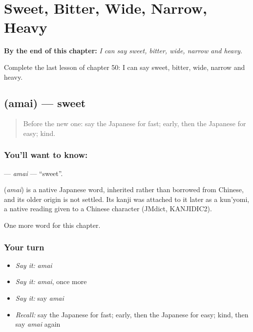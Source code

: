 
\chapter{Sweet, Bitter, Wide, Narrow, Heavy}
\label{ch:ja-sweet-bitter-wide-narrow-heavy}

\begin{chapteropening}
\textbf{By the end of this chapter:} \emph{I can say sweet, bitter, wide, narrow and heavy.}

Complete the last lesson of chapter 50: I can say sweet, bitter, wide, narrow and heavy.
\end{chapteropening}

\section[\texorpdfstring{\ja{あまい} (amai)}{あまい (amai)}]{ (amai) — sweet}

\label{lesson:JA-C50-amai}



\begin{quote}
Before the new one: say the Japanese for fast; early, then the Japanese for easy; kind.
\end{quote}

\subsection*{You'll want to know: }
\textbf{} — \emph{amai} — \textquotedblleft{}sweet\textquotedblright{}.

\begin{cousinweb}
\textbf{} (\emph{amai}) is a native Japanese word, inherited rather than borrowed from Chinese, and its older origin is not settled. Its kanji was attached to it later as a kun'yomi, a native reading given to a Chinese character (JMdict, KANJIDIC2).
\end{cousinweb}

\begin{grammarlens}[title={What you've built}]
One more word for this chapter.
\end{grammarlens}

\subsection*{Your turn}
\begin{itemize}
\raggedright
  \item \emph{Say it:} \emph{amai}
  \item \emph{Say it:} \emph{amai}, once more
  \item \emph{Say it:} say \emph{amai}
  \item \emph{Recall:} say the Japanese for fast; early, then the Japanese for easy; kind, then say \emph{amai} again
\end{itemize}

